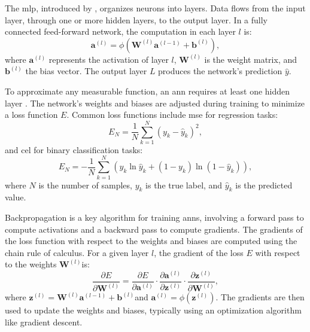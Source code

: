 \documentclass[12pt, a4paper, headinclude, twoside, plainheadsepline, open=right, numbers=noenddot, hidelinks, toc=listof, toc=bibliography]{scrreprt}
\begin{document}
The \ac{mlp}, introduced by \citeauthor{rosenblattPerceptronProbabilisticModel1958} \cite{rosenblattPerceptronProbabilisticModel1958}, organizes neurons into layers. 
Data flows from the input layer, through one or more hidden layers, to the output layer. In a fully connected feed-forward network, the computation in each layer $l$ is:
\begin{equation}
\mathbf{a}^{(l)} = \phi (\mathbf{W}^{(l)} \mathbf{a}^{(l-1)} + \mathbf{b}^{(l)}),
\end{equation}
where $\mathbf{a}^{(l)}$ represents the activation of layer $l$, $\mathbf{W}^{(l)}$ is the weight matrix, and $\mathbf{b}^{(l)}$ the bias vector. 
The output layer $L$ produces the network's prediction $\hat{y}$.

To approximate any measurable function, an \ac{ann} requires at least one hidden layer \cite{hornikMultilayerFeedforwardNetworks1989}. 
The network's weights and biases are adjusted during training to minimize a loss function $E$. Common loss functions include \ac{mse} for regression tasks:
\begin{equation}
E_N = \frac{1}{N} \sum_{k=1}^{N}(y_{k} - \hat{y}_{k})^2,
\end{equation}
and \ac{cel} for binary classification tasks:
\begin{equation}
E_N = -\frac{1}{N} \sum_{k=1}^{N} \left( y_k \ln{\hat{y}_k} + (1-y_k) \ln{(1-\hat{y}_k)} \right),
\end{equation}
where $N$ is the number of samples, $y_k$ is the true label, and $\hat{y}_k$ is the predicted value.

Backpropagation is a key algorithm for training \acp{ann}, involving a forward pass to compute activations and a backward pass to compute gradients. 
The gradients of the loss function with respect to the weights and biases are computed using the chain rule of calculus. For a given layer $l$, the gradient of the loss $E$ with respect to the weights $\mathbf{W}^{(l)}$is:
\begin{equation}
\frac{\partial E}{\partial \mathbf{W}^{(l)}} = \frac{\partial E}{\partial \mathbf{a}^{(l)}} \cdot \frac{\partial \mathbf{a}^{(l)}}{\partial \mathbf{z}^{(l)}} \cdot \frac{\partial \mathbf{z}^{(l)}}{\partial \mathbf{W}^{(l)}},
\end{equation}
where $\mathbf{z}^{(l)} = \mathbf{W}^{(l)} \mathbf{a}^{(l-1)} + \mathbf{b}^{(l)}$and $\mathbf{a}^{(l)} = \phi(\mathbf{z}^{(l)})$. 
The gradients are then used to update the weights and biases, typically using an optimization algorithm like gradient descent.
\end{document}
